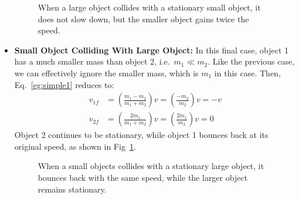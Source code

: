 \documentclass{../../oss-handout}
\begin{document}
\begin{itemize}[leftmargin=15pt]
\begin{figure}[ht]
    \caption{When a large object collides with a stationary small object, 
    it does not slow down, but the smaller object gains twice the speed.}
    \label{fig:big-small}
  \end{figure}
\item\textbf{Small Object Colliding With Large Object:} In this final case,
  object 1 has a much smaller mass than object 2, i.e.\ $m_1\ll m_2$. Like the
  previous case, we can effectively ignore the smaller mass, which is $m_1$ in
  this case. Then, Eq.~\ref{eg:simple1} reduces to:
  \begin{align*}
    v_{1f}&=\left(\frac{m_1-m_2}{m_1+m_2}\right)v=\left(\frac{-m_2}{m_2}\right)v
    =-v\\
    v_{2f}&=\left(\frac{2m_1}{m_1+m_2}\right)v=\left(\frac{2m_1}{m_2}\right)v=0
  \end{align*}
  Object 2 continues to be stationary, while object 1 bounces back at its
  original speed, as shown in Fig~\ref{fig:big-small}.
  \begin{figure}[ht]
    \centering
    \caption{When a small objects collides with a stationary large object, it
      bounces back with the same speed, while the larger object remains
      stationary.}
  \end{figure}
\end{itemize}
\end{document}
